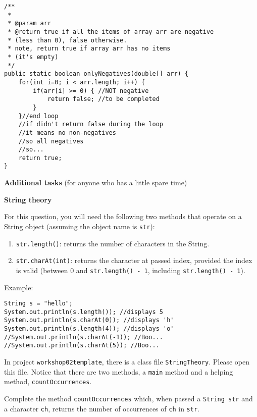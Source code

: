 \begin{questions}
\begin{solution}
\begin{lstlisting}
/**
 * 
 * @param arr
 * @return true if all the items of array arr are negative 
 * (less than 0), false otherwise.
 * note, return true if array arr has no items 
 * (it's empty)
 */
public static boolean onlyNegatives(double[] arr) {
	for(int i=0; i < arr.length; i++) {
		if(arr[i] >= 0) { //NOT negative
			return false; //to be completed
		}
	}//end loop
	//if didn't return false during the loop
	//it means no non-negatives
	//so all negatives
	//so...
	return true;
}
\end{lstlisting}	
\end{solution}

\newpage

\begin{center}
\LARGE \textbf{Additional tasks} (for anyone who has a little spare time)
\end{center}

\question \textbf{String theory} \vskip 0.5cm

For this question, you will need the following two methods that operate on a String object (assuming the object name is \texttt{str}):

\begin{enumerate} 
\item \texttt{str.length()}: returns the number of characters in the String.
\item \texttt{str.charAt(int)}: returns the character at passed index, provided the index is valid (between 0 and \texttt{str.length() - 1}, including \texttt{str.length() - 1}).
\end{enumerate}

Example:

\begin{lstlisting}
String s = "hello";
System.out.println(s.length()); //displays 5
System.out.println(s.charAt(0)); //displays 'h'
System.out.println(s.length(4)); //displays 'o'
//System.out.println(s.charAt(-1)); //Boo...
//System.out.println(s.charAt(5)); //Boo...
\end{lstlisting}

In project \texttt{workshop02template}, there is a class file \texttt{StringTheory}.  Please open this file. Notice that there are two methods, a \texttt{main} method and a helping method, \texttt{countOccurrences}.

Complete the method \texttt{countOccurrences} which, when passed a \texttt{String str} and a character \texttt{ch}, returns the number of occurrences of \texttt{ch} in \texttt{str}.


\end{questions}
